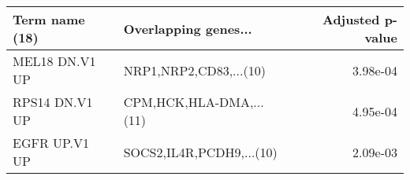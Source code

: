 \begin{tabular}{llr}
\toprule
Term name (18) &     Overlapping genes... &  Adjusted p-value \\
\midrule
MEL18 DN.V1 UP &   NRP1,NRP2,CD83,...(10) &          3.98e-04 \\
RPS14 DN.V1 UP &  CPM,HCK,HLA-DMA,...(11) &          4.95e-04 \\
 EGFR UP.V1 UP & SOCS2,IL4R,PCDH9,...(10) &          2.09e-03 \\
\bottomrule
\end{tabular}
